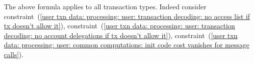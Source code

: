 \[		%
	\]
	\saNote{}
	The above formula applies to all transaction types.
	Indeed consider
	constraint~(\ref{user txn data: processing: user: transaction decoding: no access list if tx doesn't allow it}),
	constraint~(\ref{user txn data: processing: user: transaction decoding: no account delegations if tx doesn't allow it}),
	constraint~(\ref{user txn data: processing: user: common computations: init code cost vanishes for message calls}).

